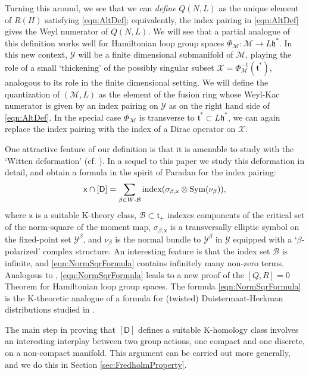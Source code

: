 \documentclass[11pt,reqno]{amsart}
\theoremstyle{definition}
\theoremstyle{remark}
\newcommand{\st}[1]{\mathsf{#1}}
\def\t{\ensuremath{\mathfrak{t}}}
\def\h{\ensuremath{\mathfrak{h}}}
\def\B{\ensuremath{\mathcal{B}}}
\def\Y{\ensuremath{\mathcal{Y}}}
\def\X{\ensuremath{\mathcal{X}}}
\def\M{\ensuremath{\mathcal{M}}}
\def\index{\ensuremath{\textnormal{index}}}
\def\Sym{\ensuremath{\textnormal{Sym}}}
\begin{document}
Turning this around, we see that we can \emph{define} $Q(N,L)$ as the unique element of $R(H)$ satisfying \eqref{eqn:AltDef}; equivalently, the index pairing in \eqref{eqn:AltDef} gives the Weyl numerator of $Q(N,L)$.  We will see that a partial analogue of this definition works well for Hamiltonian loop group spaces $\Phi_{\M}\colon \M \rightarrow L\h^\ast$.  In this new context, $\Y$ will be a finite dimensional submanifold of $\M$, playing the role of a small `thickening' of the possibly singular subset $\X=\Phi_{\M}^{-1}(\t^\ast)$, analogous to its role in the finite dimensional setting.  We will define the quantization of $(\M,L)$ as the element of the fusion ring whose Weyl-Kac numerator is given by an index pairing on $\Y$ as on the right hand side of \eqref{eqn:AltDef}.  In the special case $\Phi_{\M}$ is transverse to $\t^\ast \subset L\h^\ast$, we can again replace the index pairing with the index of a Dirac operator on $\X$.

One attractive feature of our definition is that it is amenable to study with the `Witten deformation' (cf. \cite{TianZhang,ParadanRiemannRoch,WittenNonAbelian}).  In a sequel to this paper \cite{LSWittenDef} we study this deformation in detail, and obtain a formula in the spirit of Paradan \cite{ParadanRiemannRoch} for the index pairing:
\begin{equation} 
\label{eqn:NormSqrFormula}
\st{x}\cap [\st{D}]=\sum_{\beta \in W\cdot \B} \index(\sigma_{\beta,\st{x}} \otimes \Sym(\nu_\beta)),
\end{equation}
where $\st{x}$ is a suitable K-theory class, $\B \subset \t_+$ indexes components of the critical set of the norm-square of the moment map, $\sigma_{\beta,\st{x}}$ is a transversally elliptic symbol on the fixed-point set $\Y^\beta$, and $\nu_\beta$ is the normal bundle to $\Y^\beta$ in $\Y$ equipped with a `$\beta$-polarized' complex structure.  An interesting feature is that the index set $\B$ is infinite, and \eqref{eqn:NormSqrFormula} contains infinitely many non-zero terms.  Analogous to \cite{ParadanRiemannRoch}, \eqref{eqn:NormSqrFormula} leads to a new proof of the $[Q,R]=0$ Theorem for Hamiltonian loop group spaces.  The formula \eqref{eqn:NormSqrFormula} is the K-theoretic analogue of a formula for (twisted) Duistermaat-Heckman distributions studied in \cite{DHNormSquare}.

The main step in proving that $[\st{D}]$ defines a suitable K-homology class involves an interesting interplay between two group actions, one compact and one discrete, on a non-compact manifold.  This argument can be carried out more generally, and we do this in Section \ref{sec:FredholmProperty}.
\end{document}
